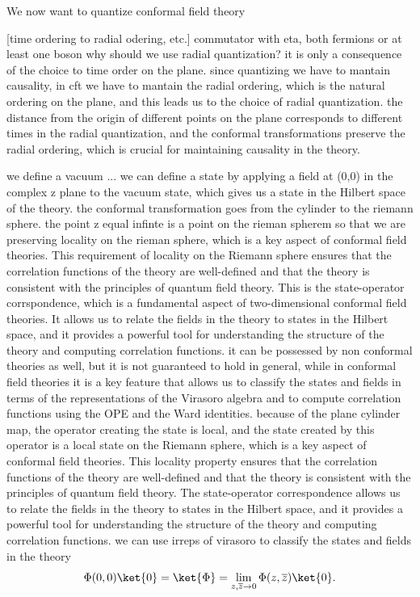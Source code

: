We now want to quantize conformal field theory

    [time ordering to radial odering, etc.]
commutator with eta, both fermions or at least one boson
why should we use radial quantization? it is only a consequence of the choice to time order on the plane.
since quantizing we have to mantain causality, in cft we have to mantain the radial ordering, which is the natural ordering on the plane, and this leads us to the choice of radial quantization. the distance from the origin of different points on the plane corresponds to different times in the radial quantization, and the conformal transformations preserve the radial ordering, which is crucial for maintaining causality in the theory.

we define a vacuum ...
we can define a state by applying a field at (0,0) in the complex z plane to the vacuum state, which gives us a state in the Hilbert space of the theory.
the conformal transformation goes from the cylinder to the riemann sphere. the point z equal infinte is a point on the rieman spherem so that we are preserving locality on the rieman sphere, which is a key aspect of conformal field theories. This requirement of locality on the Riemann sphere ensures that the correlation functions of the theory are well-defined and that the theory is consistent with the principles of quantum field theory.
This is the state-operator corrspondence, which is a fundamental aspect of two-dimensional conformal field theories. It allows us to relate the fields in the theory to states in the Hilbert space, and it provides a powerful tool for understanding the structure of the theory and computing correlation functions. it can be possessed by non conformal theories as well, but it is not guaranteed to hold in general, while in conformal field theories it is a key feature that allows us to classify the states and fields in terms of the representations of the Virasoro algebra and to compute correlation functions using the OPE and the Ward identities.
because of the plane cylinder map, the operator creating the state is local, and the state created by this operator is a local state on the Riemann sphere, which is a key aspect of conformal field theories. This locality property ensures that the correlation functions of the theory are well-defined and that the theory is consistent with the principles of quantum field theory. The state-operator correspondence allows us to relate the fields in the theory to states in the Hilbert space, and it provides a powerful tool for understanding the structure of the theory and computing correlation functions.
we can use irreps of virasoro to classify the states and fields in the theory
\[
    \Phi(0,0) \ket{0} = \ket{\Phi} = \lim_{z,\overline{z} \to 0} \Phi(z,\overline{z}) \ket{0}.
\]


